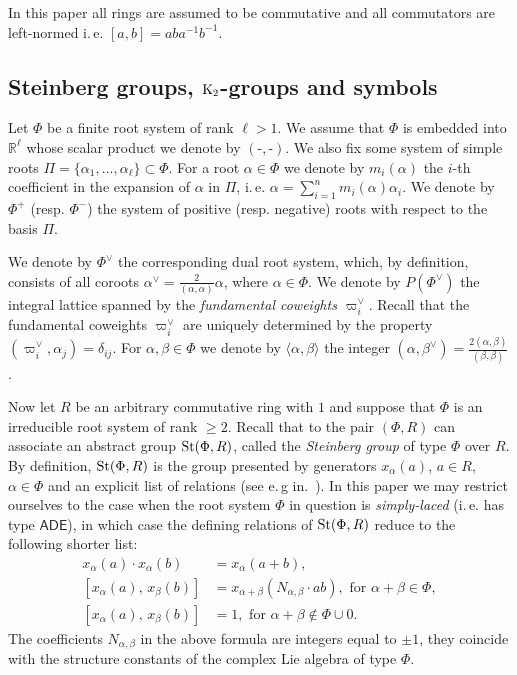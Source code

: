 In this paper all rings are assumed to be commutative and all commutators are left-normed i.\,e. $[a, b] = a b a^{-1} b^{-1}$.

\subsection{Steinberg groups, $\operatorname{K}_2$-groups and symbols}\label{subsec:steinberg-preliminaries}
Let $\Phi$ be a finite root system of rank $\ell > 1$.
We assume that $\Phi$ is embedded into $\mathbb{R}^\ell$ whose scalar product we denote by $(\text{-}, \text{-})$.
We also fix some system of simple roots $\Pi = \{\alpha_1, \ldots, \alpha_\ell\} \subset \Phi$.
For a root $\alpha\in\Phi$ we denote by $m_i(\alpha)$ the $i$-th coefficient in the expansion of $\alpha$ in $\Pi$,
i.\,e. $\alpha = \sum_{i=1}^n m_i(\alpha) \alpha_i$.
We denote by $\Phi^+$ (resp. $\Phi^-$) the system of positive (resp. negative) roots with respect to the basis $\Pi$.

We denote by $\Phi^\vee$ the corresponding dual root system, which, by definition, consists of all coroots $\alpha^\vee = \frac{2}{(\alpha, \alpha)} \alpha$, where $\alpha \in \Phi$.
We denote by $P(\Phi^\vee)$ the integral lattice spanned by the \emph{fundamental coweights $\varpi_i^\vee$}.
Recall that the fundamental coweights $\varpi_i^\vee$ are uniquely determined by the property $(\varpi_i^\vee, \alpha_j) = \delta_{ij}$.
For $\alpha,\beta \in \Phi$ we denote by $\langle \alpha, \beta \rangle$ the integer $(\alpha, \beta^\vee) = \frac{2(\alpha, \beta)}{(\beta, \beta)}$.

Now let $R$ be an arbitrary commutative ring with $1$ and suppose that $\Phi$ is an irreducible root system of rank $\geq 2$.
Recall that to the pair $(\Phi, R)$ can associate an abstract group $\operatorname{St}(\Phi, R)$, called the \textit{Steinberg group} of type $\Phi$ over $R$.
By definition, $\operatorname{St}(\Phi, R)$ is the group presented by generators $x_\alpha(a)$, $a \in R$, $\alpha \in \Phi$ and an explicit list of relations (see e.\,g in.~\cite{Ma69, St71}).
In this paper we may restrict ourselves to the case when the root system $\Phi$ in question is \textit{simply-laced} (i.\,e. has type $\mathsf{ADE}$),
 in which case the defining relations of $\operatorname{St}(\Phi, R)$ reduce to the following shorter list:
\begin{align}
x_{\alpha}(a)\cdot x_{\alpha}(b)&=x_{\alpha}(a+b), \tag{R1} \label{x-additivity}\\
[x_{\alpha}(a),\,x_{\beta}(b)]  &=x_{\alpha+\beta}(N_{\alpha,\beta} \cdot ab),\text{ for }\alpha+\beta\in\Phi, \tag{R2} \label{R2} \\
[x_{\alpha}(a),\,x_{\beta}(b)]  &=1,\text{ for }\alpha+\beta\not\in\Phi\cup0. \tag{R3} \label{R3}
\end{align}
The coefficients $N_{\alpha,\beta}$ in the above formula are integers equal to $\pm 1$, they coincide with the structure constants of the complex Lie algebra of type $\Phi$.

